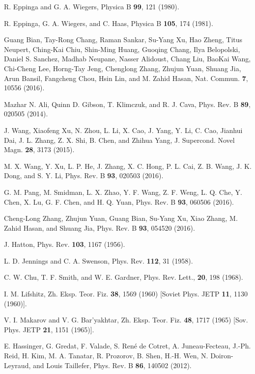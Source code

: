 \documentclass[aps,prb,preprint,groupedaddress,showpacs,amsmath,amssymb]{revtex4}
\begin{document}
\begin{thebibliography}{99}

R. Eppinga and G. A. Wiegers, Physica B {\bf 99}, 121 (1980).

R. Eppinga, G. A. Wiegers, and C. Haas, Physica B {\bf 105}, 174 (1981).

Guang Bian, Tay-Rong Chang, Raman Sankar,	Su-Yang Xu, Hao Zheng, Titus Neupert, Ching-Kai Chiu, Shin-Ming Huang, Guoqing Chang, Ilya Belopolski, Daniel S. Sanchez, Madhab Neupane, Nasser Alidoust, Chang Liu, BaoKai Wang, Chi-Cheng Lee, Horng-Tay Jeng, Chenglong Zhang, Zhujun Yuan, Shuang Jia, Arun Bansil, Fangcheng Chou, Hsin Lin, and M. Zahid Hasan, Nat. Commun. {\bf 7}, 10556 (2016).

Mazhar N. Ali, Quinn D. Gibson, T. Klimczuk, and R. J. Cava, Phys. Rev. B {\bf 89}, 020505 (2014).

J. Wang, Xiaofeng Xu, N. Zhou, L. Li, X. Cao, J. Yang, Y. Li, C. Cao, Jianhui Dai, J. L. Zhang, Z. X. Shi, B. Chen, and Zhihua Yang, J. Supercond. Novel Magn. {\bf 28}, 3173 (2015).

M. X. Wang, Y. Xu, L. P. He, J. Zhang, X. C. Hong, P. L. Cai, Z. B. Wang, J. K. Dong, and S. Y. Li, Phys. Rev. B {\bf 93}, 020503 (2016). 

G. M. Pang, M. Smidman, L. X. Zhao, Y. F. Wang, Z. F. Weng, L. Q. Che, Y. Chen, X. Lu, G. F. Chen, and H. Q. Yuan, Phys. Rev. B {\bf 93}, 060506 (2016).

Cheng-Long Zhang, Zhujun Yuan, Guang Bian, Su-Yang Xu, Xiao Zhang, M. Zahid Hasan, and Shuang Jia, Phys. Rev. B {\bf 93}, 054520 (2016).

J. Hatton, Phys. Rev. {\bf 103}, 1167 (1956).

L. D. Jennings and C. A. Swenson,  Phys. Rev. {\bf 112}, 31 (1958).

C. W. Chu, T. F. Smith,  and W. E. Gardner, Phys. Rev. Lett., {\bf 20}, 198 (1968).

I. M. Lifshitz, Zh. Eksp.  Teor. Fiz. {\bf 38}, 1569 (1960) [Soviet Phys.  JETP {\bf 11}, 1130 (1960)].

 V. I. Makarov and V. G. Bar'yakhtar, Zh. Eksp. Teor. Fiz. {\bf 48}, 1717 (1965) [Sov. Phys. JETP {\bf 21}, 1151 (1965)].

E. Hassinger, G. Gredat, F. Valade, S. Ren\'e de Cotret, A. Juneau-Fecteau, J.-Ph. Reid, H. Kim, M. A. Tanatar, R. Prozorov, B. Shen, H.-H. Wen, N. Doiron-Leyraud, and Louis Taillefer, Phys. Rev. B {\bf 86}, 140502 (2012).


\end{thebibliography}
\end{document}
